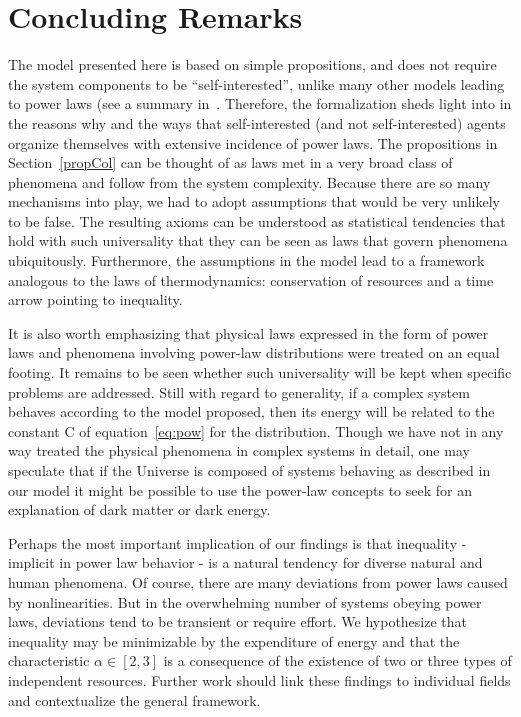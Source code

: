 \documentclass[a4paper, 11pt]{article} %
\begin{document}
\section{Concluding Remarks}
The model presented here is based on simple propositions, and does not require the system components to be ``self-interested'',
unlike many other models leading to power laws (see a summary in~\cite{newmanpower,part}. Therefore, the formalization sheds light into in the reasons why and the ways that self-interested (and not self-interested) agents organize themselves with extensive incidence of power laws. The propositions in Section~\ref{propCol} can be thought of as laws met in a very broad class of phenomena and follow from the system complexity. Because there are so many mechanisms into play, we had to adopt assumptions that would be very unlikely to be false. The resulting axioms can be understood as statistical tendencies that hold with such universality that they can be seen as laws that govern phenomena ubiquitously. 
Furthermore, the assumptions in the model lead to a framework analogous to the laws of thermodynamics:
conservation of resources and a time arrow pointing to inequality.

It is also worth emphasizing that physical laws expressed in the form of power laws and phenomena involving power-law distributions were treated on an equal footing. It remains to be seen whether such universality will be kept when specific problems are addressed. Still with regard to generality, if a complex system behaves according to the model proposed, then its energy will be related to the constant C of equation~\ref{eq:pow} for the distribution. Though we have not in any way treated the physical phenomena in complex systems in detail, one may speculate that if the Universe is composed of systems behaving as described in our model it might be possible to use the power-law concepts to seek for an explanation of dark matter or dark energy. 

Perhaps the most important implication of our findings is that inequality - implicit in power law behavior - is a natural tendency for diverse natural and human phenomena. Of course, there are many deviations from power laws caused by nonlinearities. But in the overwhelming number of systems obeying power laws, deviations tend to be transient or require effort. We hypothesize that inequality may be minimizable by the expenditure of energy and that the characteristic $\alpha \in [2,3]$ is a consequence of the existence of two or three types of independent resources. Further work should link these findings to individual fields and contextualize the general framework.
\end{document}
